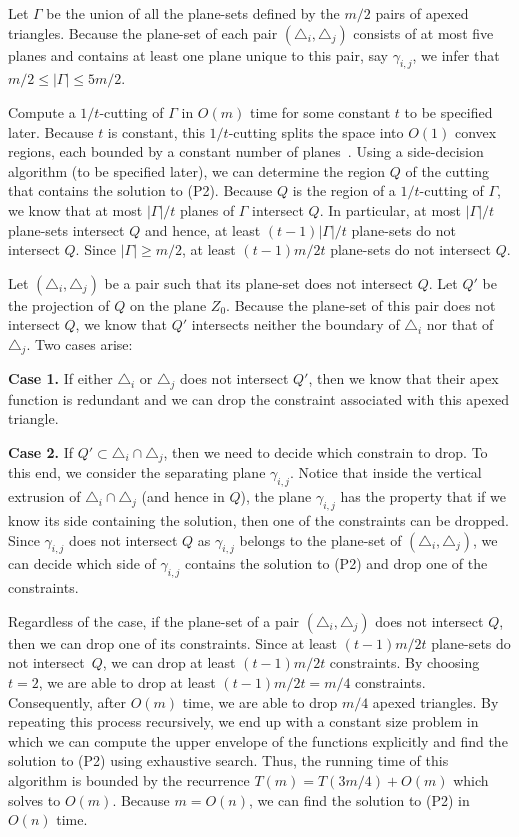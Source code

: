 \documentclass[a4paper,UKenglish]{lipics}
\begin{document}
Let $\Gamma$ be the union of all the plane-sets defined by the $m/2$ pairs of apexed triangles. 
Because the plane-set of each pair $(\triangle_i, \triangle_j)$ consists of at most five planes and contains at least one plane unique to this pair, say $\gamma_{i,j}$, we infer that $m/2\leq |\Gamma| \leq 5m/2$.

Compute a $1/t$-cutting of $\Gamma$ in $O(m)$ time for some constant $t$ to be specified later.
Because $t$ is constant, this $1/t$-cutting splits the space into $O(1)$ convex regions, each bounded by a constant number of planes~\cite{matousekCuttings}. 
Using a side-decision algorithm (to be specified later), we can determine the region $Q$ of the cutting that contains the solution to (P2). Because $Q$ is the region of a $1/t$-cutting of $\Gamma$, we know that at most $|\Gamma|/t$ planes of $\Gamma$ intersect $Q$. 
In particular, at most $|\Gamma|/t$ plane-sets intersect $Q$ and hence, at least $(t-1)|\Gamma|/t$ plane-sets do not intersect $Q$. 
Since $|\Gamma| \geq m/2$, at least $(t-1)m/2t$ plane-sets do not intersect $Q$.

Let $(\triangle_i, \triangle_j)$ be a pair such that its plane-set does not intersect $Q$. 
Let $Q'$ be the projection of $Q$ on the plane $Z_0$. Because the plane-set of this pair does not intersect $Q$, we know that $Q'$ intersects neither the boundary of $\triangle_i$ nor that of $\triangle_j$.
Two cases arise:

\textbf{Case 1.} If either $\triangle_i$ or $\triangle_j$ does not intersect $Q'$, then we know that their apex function is redundant and we can drop the constraint associated with this apexed triangle.

\textbf{Case 2.} If $Q'\subset \triangle_i\cap \triangle_j$, then we need to decide which constrain to drop. 
To this end, we consider the separating plane $\gamma_{i,j}$. Notice that inside the vertical extrusion of $\triangle_i\cap \triangle_j$ (and hence in $Q$), the plane $\gamma_{i,j}$ has the property that if we know its side containing the solution, then one of the constraints can be dropped. Since $\gamma_{i,j}$ does not intersect $Q$ as $\gamma_{i,j}$ belongs to the plane-set of $(\triangle_i, \triangle_j)$, we can decide which side of $\gamma_{i,j}$ contains the solution to (P2) and drop one of the constraints.
\vspace{.05in}

Regardless of the case, if the plane-set of a pair $(\triangle_i, \triangle_j)$ does not intersect $Q$, then we can drop one of its constraints. 
Since at least $(t-1)m/2t$ plane-sets do not intersect~$Q$, we can drop at least $(t-1)m/2t$ constraints.
By choosing $t = 2$, we are able to drop at least $(t-1)m/2t = m/4$ constraints.
Consequently, after $O(m)$ time, we are able to drop $m/4$ apexed triangles.
By repeating this process recursively, we end up with a constant size problem in which we can compute the upper envelope of the functions explicitly and find the solution to (P2) using exhaustive search. 
Thus, the running time of this algorithm is bounded by the recurrence $T(m) = T(3m/4) + O(m)$ which solves to $O(m)$. 
Because $m = O(n)$, we can find the solution to (P2) in $O(n)$ time.
\end{document}
